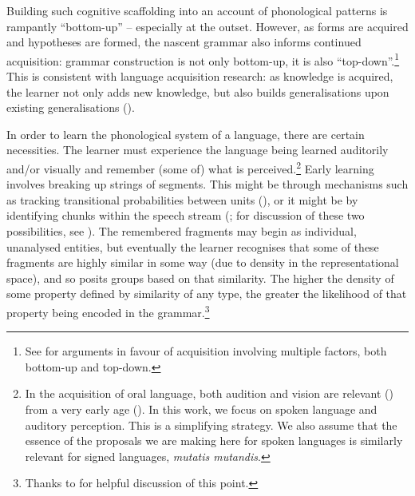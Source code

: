 Building such cognitive scaffolding into an account of phonological patterns is rampantly ``bottom-up'' -- especially at the outset. However, as forms are acquired and hypotheses are formed, the nascent grammar also informs continued acquisition: grammar construction is not only bottom-up, it is also ``top-down''.\footnote{See \citet{Rose:2009, Rose+:2011, Rose:2014emergence} for arguments in favour of acquisition involving multiple factors, both bottom-up and top-down.} This is consistent with language acquisition research: as knowledge is acquired, the learner not only adds new knowledge, but also builds generalisations upon existing generalisations (\citealt{Martin+:2013, Curtin+:2014}).  

In order to learn the phonological system of a language, there are certain necessities. The learner must experience the language being learned auditorily and/or visually and remember (some of) what is perceived.\footnote{In the acquisition of oral language, both audition and vision are relevant (\citealt{McGurk+:1976, Rosenblum+:1997, Burnham+:2004}) from a very early age (\citealt{Coulon+:2013, Weikum+:2007}). In this work, we focus on spoken language and auditory perception. This is a simplifying strategy. We also assume that the essence of the proposals we are making here for spoken languages is similarly relevant for signed languages, {\it mutatis mutandis}.} Early learning involves breaking up strings of segments. This might be through mechanisms such as tracking transitional probabilities between units (\citealt{Saffran+:1996san}), or it might be by identifying chunks within the speech stream (\citealt{Perruchet+:1998}; for discussion of these two possibilities, see \citealt{Black:2018}). The remembered fragments may begin as individual, unanalysed entities, but eventually the learner recognises that some of these fragments are highly similar in some way (due to density in the representational space), and so posits groups based on that similarity. The higher the density of some property defined by similarity of any type, the greater the likelihood of that property being encoded in the grammar.\footnote{Thanks to  for helpful discussion of this point.}


